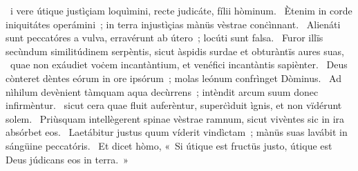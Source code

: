 \psalmChapterWithInscription{}
{ }
{%
~i vere útique justìçiam loquìmini, recte judicáte, fílii hòminum. 
~Ètenim in corde iniquitátes operámini~; in terra injustìçias mànüs vèstrae conċìnnant. 
~Alienáti sunt peccatóres a vulva, erravérunt ab útero~; locúti sunt falsa. 
~Furor illïs secùndum similitúdinem serpèntis, sicut àspidis surdae et obturàntïs aures suas, 
~quae non exáudiet voċem incantàntium, et venéfici incantàntis sapiènter. 
~Deus cònteret dèntes eórum in ore ipsórum~; molas leónum confrìnget Dòminus. 
~Ad nìhilum devènient tàmquam aqua decùrrens~; intèndit arcum suum donec infirmèntur. 
~sicut cera quae fluit auferèntur, superċìduit ìgnis, et non vïdérunt solem. 
~Priùsquam intellègerent spinae vèstrae ramnum, sicut vivèntes sic in ira absórbet eos. 
~Laetábitur justus quum víderit vindìctam~; mànüs suas lavábit in sángüine peccatóris. 
~Et dicet hòmo, «~Si útique est fructüs justo, útique est Deus júdicans eos in terra.~»
}

